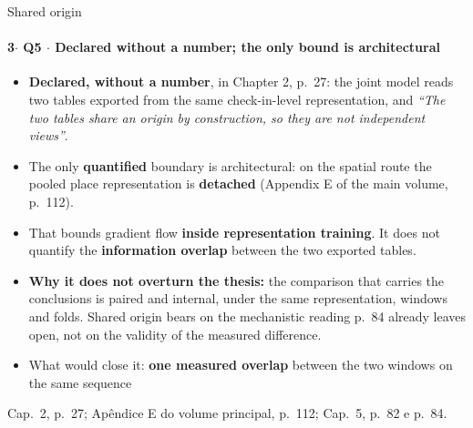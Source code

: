 \documentclass{beamer}
\begin{document}
\begin{frame}[noframenumbering]{Shared origin}
    \framesubtitle{\normalsize 3$\cdot$ \textbf{Q5} $\cdot$ Declared without a number; the only bound is architectural}
    \hypertarget{q5}{}
    \hypertarget{u3}{}%
    \small
    \begin{itemize}\setlength{\itemsep}{0pt}\setlength{\parskip}{0pt}
        \item \textbf{Declared, without a number}, in Chapter 2, p.~27: the joint model reads two tables exported from the same check-in-level representation, and \textit{``The two tables share an origin by construction, so they are not independent views''}.
        \item The only \textbf{quantified} boundary is architectural: on the spatial route the pooled place representation is \textbf{detached} (Appendix E of the main volume, p.~112).
        \item That bounds gradient flow \textbf{inside representation training}. It does not quantify the \textbf{information overlap} between the two exported tables.
        \item \textbf{Why it does not overturn the thesis:} the comparison that carries the conclusions is paired and internal, under the same representation, windows and folds. Shared origin bears on the mechanistic reading p.~84 already leaves open, not on the validity of the measured difference.
        \item What would close it: \textbf{one measured overlap} between the two windows on the same sequence
    \end{itemize}
    \vfill
    {\scriptsize
    \begin{minipage}[b]{0.775\linewidth}\raggedright\textcolor{black!70}{Cap.~2, p.~27; Apêndice E do volume principal, p.~112; Cap.~5, p.~82 e p.~84.}\end{minipage}\hfill
    \begin{minipage}[b]{0.20\linewidth}\raggedleft \hyperlink{b0}{}\end{minipage}}
\end{frame}
\end{document}
